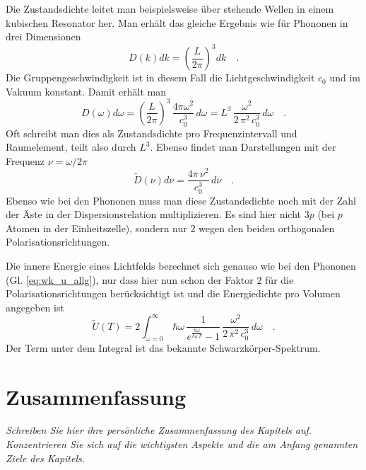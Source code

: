 Die Zustandsdichte leitet man beispielsweise über stehende Wellen in einem kubischen Resonator her. Man erhält das gleiche Ergebnis wie für Phononen in drei Dimensionen
\begin{equation}
D(k) dk = \left( \frac{L}{2 \pi} \right)^3  dk \quad .
\end{equation}
Die Gruppengeschwindigkeit ist in diesem Fall die Lichtgeschwindigkeit $c_0$ und im Vakuum konstant. Damit erhält man
\begin{equation}
D(\omega) d\omega = \left( \frac{L}{2 \pi} \right)^3 \, \frac{4 \pi \omega^2}{c_0^3} \, d\omega 
= L^3 \, \frac{\omega^2}{2 \, \pi^2 \, c_0^3} \, d\omega \quad .
\end{equation}
Oft schreibt man dies als Zustandsdichte pro Frequenzintervall und Raumelement, teilt also durch $L^3$. Ebenso findet man Darstellungen mit der Frequenz $\nu = \omega / 2 \pi$
\begin{equation}
\tilde{D}(\nu) d\nu 
= \frac{4 \pi \, \nu^2}{ c_0^3} \, d\nu \quad .
\end{equation}
Ebenso wie bei den Phononen muss man diese Zustandsdichte noch mit der Zahl der Äste in der Dispersionsrelation multiplizieren. Es sind hier nicht $3p$ (bei $p$ Atomen in der Einheitszelle), sondern nur $2$ wegen den beiden orthogonalen Polarisationsrichtungen.

Die innere Energie eines Lichtfelds berechnet sich genauso wie bei den Phononen (Gl. \ref{eq:wk_u_allg}), nur dass hier nun schon der Faktor $2$ für die Polarisationsrichtungen berücksichtigt ist und die Energiedichte pro Volumen angegeben ist
\begin{equation}
\tilde{U}(T) = 2  \int_{\omega=0}^{\infty} \, \hbar \omega \, 
\frac{1}{e^{\frac{\hbar \omega}{k_B \, T} }- 1}
\, \frac{\omega^2}{2 \, \pi^2 \, c_0^3} \, d\omega \quad .
\end{equation}
Der Term unter dem Integral  ist das bekannte Schwarzkörper-Spektrum.




\newpage
\section{Zusammenfassung}

\textit{Schreiben Sie hier ihre persönliche Zusammenfassung des Kapitels auf. Konzentrieren Sie sich auf die wichtigsten Aspekte und die am Anfang genannten Ziele des Kapitels.}

\vspace*{10cm}





\printbibliography[segment=\therefsegment,heading=subbibliography]
